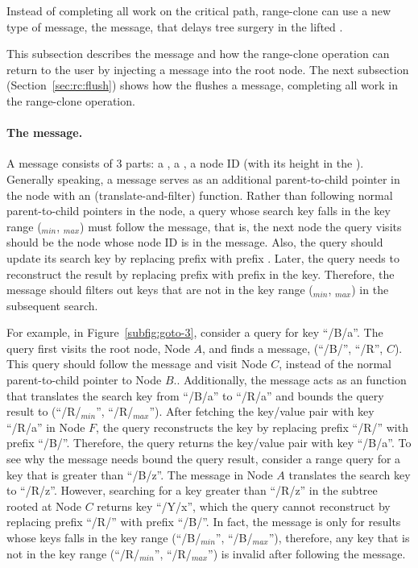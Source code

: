 Instead of completing all work on the critical path, range-clone can use a
new type of message, the \goto message, that delays tree surgery
in the lifted \bedag.

This subsection describes the \goto message and how the range-clone operation
can return to the user by injecting a \goto message into the root node.
The next subsection (Section~\ref{sec:rc:flush}) shows how the \bet flushes
a \goto message,
completing all work in the range-clone operation.

\paragraph{The \goto message.}
A \goto message consists of 3 parts: a \dpre, a \spre, a node ID
(with its height in the \bedag).
Generally speaking, a \goto message serves as an additional parent-to-child
pointer in the \bet node with an \xf (translate-and-filter) function.
Rather than following normal parent-to-child pointers in the node,
a query whose search key falls in the key range (\dpre$_{min}$, \dpre$_{max}$)
must follow the \goto message, that is, the next node the query visits
should be the node whose node ID is in the \goto message.
Also, the query should update its search key by replacing prefix \dpre with
prefix \spre.
Later, the query needs to reconstruct the result by replacing prefix \spre
with prefix \dpre in the key.
Therefore, the \goto message should filters out keys that are not in the
key range (\spre$_{min}$, \spre$_{max}$) in the subsequent search.

For example, in Figure~\ref{subfig:goto-3}, consider a query for key ``/B/a''.
The query first visits the root node, Node $A$, and finds a \goto message,
\goto(``/B/'', ``/R'', $C$).
This query should follow the \goto message and visit Node $C$,
instead of the normal parent-to-child pointer to Node $B$..
Additionally, the \goto message acts as an \xf function that translates the
search key from ``/B/a'' to ``/R/a'' and bounds the query result to
(``/R/$_{min}$'', ``/R/$_{max}$'').
After fetching the key/value pair with key ``/R/a'' in Node $F$,
the query reconstructs the key by replacing prefix ``/R/'' with prefix ``/B/''.
Therefore, the query returns the key/value pair with key ``/B/a''.
To see why the \goto message needs bound the query result,
consider a range query for a key that is greater than ``/B/z''.
The \goto message in Node $A$ translates the search key to ``/R/z''.
However, searching for a key greater than ``/R/z'' in the subtree rooted at
Node $C$ returns key ``/Y/x'',
which the query cannot reconstruct by replacing prefix ``/R/'' with prefix
``/B/''.
In fact, the \goto message is only for results whose keys falls in the key
range (``/B/$_{min}$'', ``/B/$_{max}$''),
therefore, any key that is not in the key range
(``/R/$_{min}$'', ``/R/$_{max}$'') is invalid after following the \goto message.


